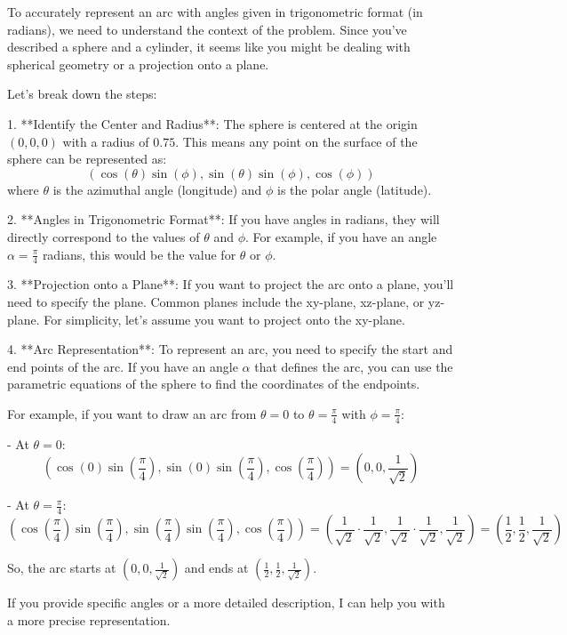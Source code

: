 To accurately represent an arc with angles given in trigonometric format (in radians), we need to understand the context of the problem. Since you've described a sphere and a cylinder, it seems like you might be dealing with spherical geometry or a projection onto a plane.

Let's break down the steps:

1. **Identify the Center and Radius**: The sphere is centered at the origin \((0, 0, 0)\) with a radius of \(0.75\). This means any point on the surface of the sphere can be represented as:
   \[
   (\cos(\theta) \sin(\phi), \sin(\theta) \sin(\phi), \cos(\phi))
   \]
   where \(\theta\) is the azimuthal angle (longitude) and \(\phi\) is the polar angle (latitude).

2. **Angles in Trigonometric Format**: If you have angles in radians, they will directly correspond to the values of \(\theta\) and \(\phi\). For example, if you have an angle \(\alpha = \frac{\pi}{4}\) radians, this would be the value for \(\theta\) or \(\phi\).

3. **Projection onto a Plane**: If you want to project the arc onto a plane, you'll need to specify the plane. Common planes include the xy-plane, xz-plane, or yz-plane. For simplicity, let's assume you want to project onto the xy-plane.

4. **Arc Representation**: To represent an arc, you need to specify the start and end points of the arc. If you have an angle \(\alpha\) that defines the arc, you can use the parametric equations of the sphere to find the coordinates of the endpoints.

For example, if you want to draw an arc from \(\theta = 0\) to \(\theta = \frac{\pi}{4}\) with \(\phi = \frac{\pi}{4}\):

- At \(\theta = 0\):
  \[
  (\cos(0) \sin(\frac{\pi}{4}), \sin(0) \sin(\frac{\pi}{4}), \cos(\frac{\pi}{4})) = (0, 0, \frac{1}{\sqrt{2}})
  \]

- At \(\theta = \frac{\pi}{4}\):
  \[
  (\cos(\frac{\pi}{4}) \sin(\frac{\pi}{4}), \sin(\frac{\pi}{4}) \sin(\frac{\pi}{4}), \cos(\frac{\pi}{4})) = (\frac{1}{\sqrt{2}} \cdot \frac{1}{\sqrt{2}}, \frac{1}{\sqrt{2}} \cdot \frac{1}{\sqrt{2}}, \frac{1}{\sqrt{2}}) = (\frac{1}{2}, \frac{1}{2}, \frac{1}{\sqrt{2}})
  \]

So, the arc starts at \((0, 0, \frac{1}{\sqrt{2}})\) and ends at \((\frac{1}{2}, \frac{1}{2}, \frac{1}{\sqrt{2}})\).

If you provide specific angles or a more detailed description, I can help you with a more precise representation.